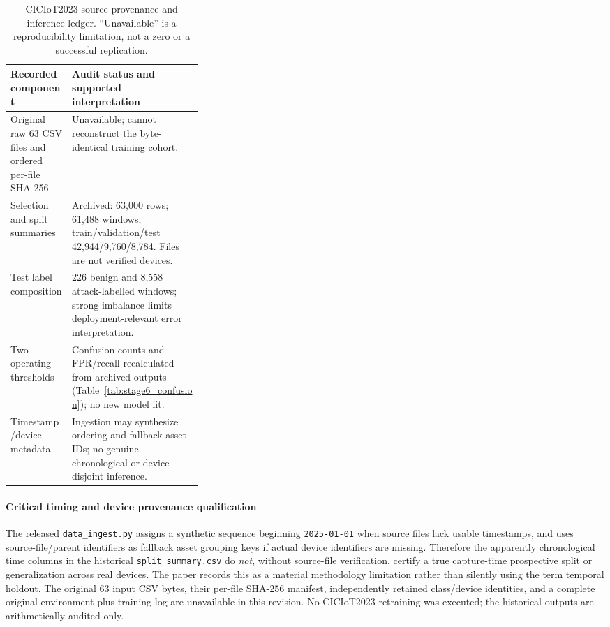 \documentclass[12pt,a4paper]{article}
\begin{document}
\begin{table}[tbp]\centering\footnotesize
\caption{CICIoT2023 source-provenance and inference ledger. ``Unavailable'' is a reproducibility limitation, not a zero or a successful replication.}\label{tab:ciciot-provenance-ledger}
\begin{tabularx}{\linewidth}{@{}p{0.32\linewidth}Y@{}}\toprule
Recorded component & Audit status and supported interpretation \\\midrule
Original raw 63 CSV files and ordered per-file SHA-256 & Unavailable; cannot reconstruct the byte-identical training cohort. \\
Selection and split summaries & Archived: 63,000 rows; 61,488 windows; train/validation/test 42,944/9,760/8,784. Files are not verified devices. \\
Test label composition & 226 benign and 8,558 attack-labelled windows; strong imbalance limits deployment-relevant error interpretation. \\
Two operating thresholds & Confusion counts and FPR/recall recalculated from archived outputs (Table~\ref{tab:stage6_confusion}); no new model fit. \\
Timestamp/device metadata & Ingestion may synthesize ordering and fallback asset IDs; no genuine chronological or device-disjoint inference. \\
\bottomrule\end{tabularx}
\end{table}

\paragraph{Critical timing and device provenance qualification}
The released \texttt{data\_ingest.py} assigns a synthetic sequence beginning \texttt{2025-01-01} when source files lack usable timestamps, and uses source-file/parent identifiers as fallback asset grouping keys if actual device identifiers are missing. Therefore the apparently chronological time columns in the historical \texttt{split\_summary.csv} do \emph{not}, without source-file verification, certify a true capture-time prospective split or generalization across real devices. The paper records this as a material methodology limitation rather than silently using the term temporal holdout. The original 63 input CSV bytes, their per-file SHA-256 manifest, independently retained class/device identities, and a complete original environment-plus-training log are unavailable in this revision. No CICIoT2023 retraining was executed; the historical outputs are arithmetically audited only.
\end{document}
